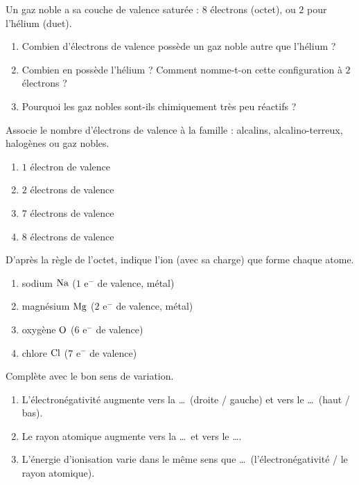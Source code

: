 \documentclass[11pt,a4paper]{article}
\begin{document}
\begin{exo}
Un gaz noble a sa couche de valence saturée : $8$ électrons (octet), ou $2$ pour l'hélium (duet).
\begin{enumerate}[label=\alph*)]
  \item Combien d'électrons de valence possède un gaz noble autre que l'hélium ?
  \item Combien en possède l'hélium ? Comment nomme-t-on cette configuration à $2$ électrons ?
  \item Pourquoi les gaz nobles sont-ils chimiquement très peu réactifs ?
\end{enumerate}
\end{exo}

\begin{exo}
Associe le nombre d'électrons de valence à la famille : alcalins, alcalino-terreux, halogènes ou gaz
nobles.
\begin{enumerate}[label=\alph*)]
  \item $1$ électron de valence
  \item $2$ électrons de valence
  \item $7$ électrons de valence
  \item $8$ électrons de valence
\end{enumerate}
\end{exo}

\begin{exo}
D'après la règle de l'octet, indique l'ion (avec sa charge) que forme chaque atome.
\begin{enumerate}[label=\alph*)]
  \item sodium $\ce{Na}$ ($1$ e$^-$ de valence, métal)
  \item magnésium $\ce{Mg}$ ($2$ e$^-$ de valence, métal)
  \item oxygène $\ce{O}$ ($6$ e$^-$ de valence)
  \item chlore $\ce{Cl}$ ($7$ e$^-$ de valence)
\end{enumerate}
\end{exo}

\begin{exo}
Complète avec le bon sens de variation.
\begin{enumerate}[label=\alph*)]
  \item L'électronégativité augmente vers la \dots\ (droite / gauche) et vers le \dots\ (haut / bas).
  \item Le rayon atomique augmente vers la \dots\ et vers le \dots.
  \item L'énergie d'ionisation varie dans le même sens que \dots\ (l'électronégativité / le rayon atomique).
\end{enumerate}
\end{exo}
\end{document}
